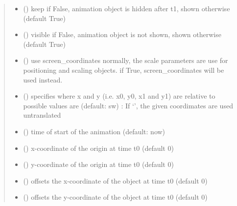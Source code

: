 \documentclass[letterpaper,10pt,english]{sphinxmanual}
\begin{document}
\begin{fulllineitems}
\begin{quote}
\begin{description}
\begin{itemize}
\item {} 
 () \textendash{} keep 
if False, animation object is hidden after t1, shown otherwise
(default True)

\item {} 
 () \textendash{} visible 
if False, animation object is not shown, shown otherwise
(default True)

\item {} 
 () \textendash{} use screen\_coordinates 
normally, the scale parameters are use for positioning and scaling
objects. 
if True, screen\_coordinates will be used instead.

\item {} 
 () \textendash{} specifies where x and y (i.e. x0, y0, x1 and y1) are relative to 
possible values are (default: sw) : 
If ‘’, the given coordimates are used untranslated

\item {} 
 () \textendash{} time of start of the animation (default: now)

\item {} 
 () \textendash{} x-coordinate of the origin at time t0 (default 0)

\item {} 
 () \textendash{} y-coordinate of the origin at time t0 (default 0)

\item {} 
 () \textendash{} offsets the x-coordinate of the object at time t0 (default 0)

\item {} 
 () \textendash{} offsets the y-coordinate of the object at time t0 (default 0)


\end{itemize}
\end{description}
\end{quote}
\end{fulllineitems}
\end{document}
